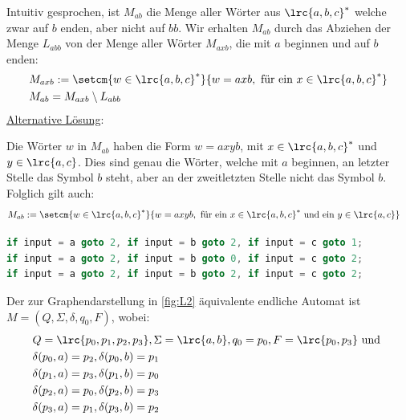 \begin{myanswer}[myexercise:0402]
	Intuitiv gesprochen, ist $M_{ab}$ die Menge aller Wörter aus $\lrc{a,b,c}^*$ welche zwar auf $b$ enden, aber nicht auf $bb$. Wir erhalten $M_{ab}$ durch das Abziehen der Menge $L_{abb}$ von der Menge aller Wörter $M_{axb}$, die mit $a$ beginnen und auf $b$ enden:
	\begin{align*}
		 & M_{axb} := \setcm{w\in\lrc{a,b,c}^*}{w = axb,\text{ für ein } x\in\lrc{a,b,c}^*} \\
		 & M_{ab} = M_{axb} \setminus L_{abb}
	\end{align*}
	\underline{Alternative Lösung}:

	Die Wörter $w$ in $M_{ab}$ haben die Form $w = axyb$, mit $x\in\lrc{a,b,c}^*$ und $y\in\lrc{a,c}$. Dies sind genau die Wörter, welche mit $a$ beginnen, an letzter Stelle das Symbol $b$ steht, aber an der zweitletzten Stelle nicht das Symbol $b$. Folglich gilt auch:
	\begin{align*}
		 & M_{ab} := \setcm{w\in\lrc{a,b,c}^*}{w = axyb,\text{ für ein } x\in\lrc{a,b,c}^* \text{ und ein } y\in\lrc{a,c}}
	\end{align*}
\end{myanswer}

\begin{myanswer}[myexercise:0403]
	\begin{lstlisting}[language=C++, firstnumber=0]
if input = a goto 2, if input = b goto 2, if input = c goto 1;
if input = a goto 2, if input = b goto 0, if input = c goto 2;
if input = a goto 2, if input = b goto 2, if input = c goto 2;
\end{lstlisting}
\end{myanswer}

\begin{myanswer}[myexercise:0404]
	Der zur Graphendarstellung in \cref{fig:L2} äquivalente endliche Automat  ist $M = (Q,\Sigma, \delta, q_0, F)$, wobei:
	\begin{align*}
		 & Q = \lrc{p_0, p_1, p_2, p_3}, \Sigma = \lrc{a,b}, q_0 = p_0, F = \lrc{p_0, p_3}\text{ und } \\
		 & \delta(p_0,a) = p_2, \delta(p_0,b) = p_1                                                    \\
		 & \delta(p_1,a) = p_3, \delta(p_1,b) = p_0                                                    \\
		 & \delta(p_2,a) = p_0, \delta(p_2,b) = p_3                                                    \\
		 & \delta(p_3,a) = p_1, \delta(p_3,b) = p_2
	\end{align*}
\end{myanswer}
